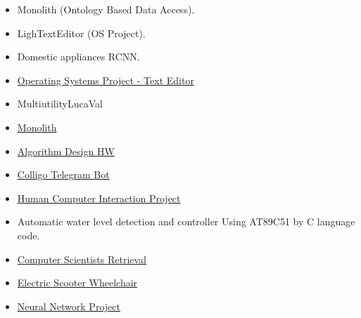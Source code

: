 \documentclass[10pt,a4paper]{altacv}
\begin{document}
\begin{itemize}
\item Monolith (Ontology Based Data Access).
\item LighTextEditor (OS Project).
\item Domestic appliances RCNN.
\item \href{https://github.com/LucaTomei/osProject}{Operating Systems Project - Text Editor}
\item MultiutilityLucaVal 
\item \href{https://github.com/LucaTomei/monolith}{Monolith}
\item\href{https://github.com/LucaTomei/Algorithm_Design_HW}{Algorithm Design HW}
\item \href{https://github.com/LucaTomei/Reti-di-Calcolatori---Colligo-Telegram-Bot}{Colligo Telegram Bot}
\item \href{https://github.com/LucaTomei/HCI_Project}{Human Computer Interaction Project}
\item Automatic water level detection and controller Using AT89C51 by C language code.
\item \href{https://github.com/LucaTomei/Computer_Scientists}{Computer Scientists Retrieval}
\item \href{https://github.com/LucaTomei/Electric-Scooter-Wheelchair}{Electric Scooter Wheelchair}
\item \href{https://github.com/LucaTomei/NN-Project}{Neural Network Project}
\end{itemize}

\divider
\end{document}
